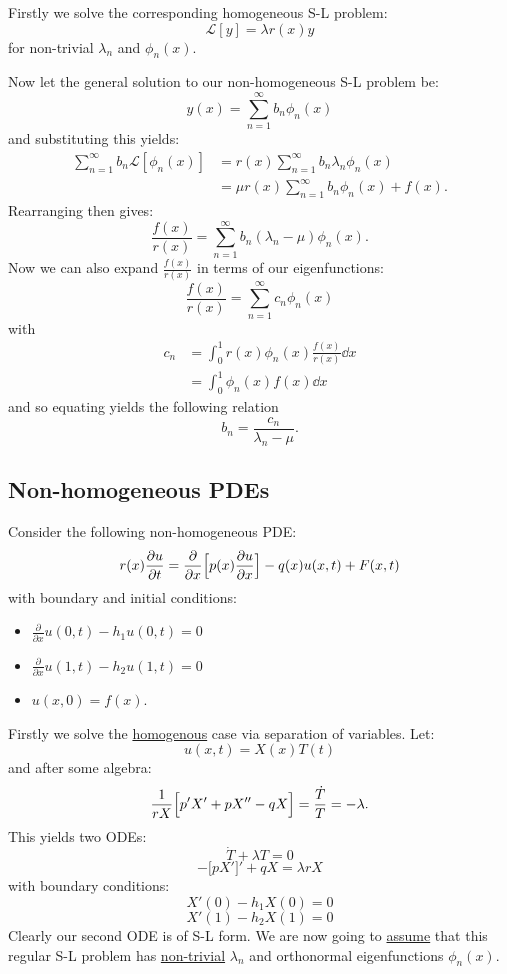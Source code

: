 \documentclass{article}
\begin{document}
Firstly we solve the corresponding homogeneous S-L problem:
$$\mathcal{L}[y]=\lambda r(x)y$$
for non-trivial $\lambda_n$ and $\phi_n(x)$.

Now let the general solution to our non-homogeneous S-L problem be:
$$y(x)=\sum_{n=1}^{\infty} b_n\phi_n(x)$$
and substituting this yields:
\begin{align*}
    \sum_{n=1}^{\infty}b_n\mathcal{L}[\phi_n(x)]
    &=r(x)\sum_{n=1}^{\infty}b_n\lambda_n\phi_n(x) \\
    &=\mu r(x)\sum_{n=1}^{\infty}b_n\phi_n(x)+f(x).
\end{align*}
Rearranging then gives:
$$\frac{f(x)}{r(x)}=\sum_{n=1}^{\infty}
b_n(\lambda_n-\mu)\phi_n(x).$$
Now we can also expand $\displaystyle\frac{f(x)}{r(x)}$
in terms of our eigenfunctions:
$$\frac{f(x)}{r(x)}=\sum_{n=1}^{\infty}c_n\phi_n(x)$$
with
\begin{align*}
    c_n
    &=\int_{0}^{1}r(x)\phi_n(x)
    \frac{f(x)}{r(x)} \dd x \\
    &=\int_{0}^{1}\phi_n(x)f(x)\dd x
\end{align*}
and so equating yields the following relation
$$b_n=\frac{c_n}{\lambda_n-\mu}.$$

\newpage

\subsection{Non-homogeneous PDEs}
Consider the following non-homogeneous PDE:
$$r(x)\frac{\partial u}{\partial t}
=\frac{\partial}{\partial x}\Bigl[
p(x)\frac{\partial u}{\partial x}
\Bigr]-q(x)u(x,t)+F(x,t)$$
with boundary and initial conditions:
\begin{itemize}
    \item $\displaystyle\frac{\partial}{\partial x}
    u(0,t)-h_1 u(0,t)=0$
    \item $\displaystyle\frac{\partial}{\partial x}
    u(1,t)-h_2 u(1,t)=0$
    \item $u(x,0)=f(x)$.
\end{itemize}
Firstly we solve the \underline{homogenous} 
case via separation of variables. Let:
$$u(x,t)=X(x)T(t)$$
and after some algebra:
$$\frac{1}{rX}\Bigl[p'X'+pX''
-qX\Bigr]=\frac{\dot{T}}{T}=-\lambda.$$
This yields two ODEs:
$$\dot{T}+\lambda T=0$$
$$-\bigl[pX'\bigr]'+qX=\lambda rX$$
with boundary conditions:
$$X'(0)-h_1 X(0)=0$$
$$X'(1)-h_2 X(1)=0$$
Clearly our second ODE is of S-L form.
We are now going to \underline{assume} that this
regular S-L problem has \underline{non-trivial} $\lambda_n$
and orthonormal eigenfunctions $\phi_n(x)$.
\end{document}
